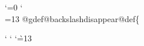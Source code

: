 {{%
%
\def\commondummiesnofonts{%
  \commondummyletter\!%
  \commondummyaccent\"%
  \commondummyaccent\'%
  \commondummyletter\*%
  \commondummyaccent\,%
  \commondummyletter\.%
  \commondummyletter\/%
  \commondummyletter\:%
  \commondummyaccent\=%
  \commondummyletter\?%
  \commondummyaccent\^%
  \commondummyaccent\`%
  \commondummyaccent\~%
  \commondummyword\u
  \commondummyword\v
  \commondummyword\H
  \commondummyword\dotaccent
  \commondummyword\ogonek
  \commondummyword\ringaccent
  \commondummyword\tieaccent
  \commondummyword\ubaraccent
  \commondummyword\udotaccent
  \commondummyword\dotless
  \commondummyword\b
  \commondummyword\i
  \commondummyword\r
  \commondummyword\sansserif
  \commondummyword\sc
  \commondummyword\slanted
  \commondummyword\t
  \commondummyword\abbr
  \commondummyword\acronym
  \commondummyword\anchor
  \commondummyword\cite
  \commondummyword\code
  \commondummyword\command
  \commondummyword\dfn
  \commondummyword\dmn
  \commondummyword\email
  \commondummyword\emph
  \commondummyword\env
  \commondummyword\file
  \commondummyword\image
  \commondummyword\indicateurl
  \commondummyword\inforef
  \commondummyword\kbd
  \commondummyword\key
  \commondummyword\math
  \commondummyword\option
  \commondummyword\pxref
  \commondummyword\ref
  \commondummyword\samp
  \commondummyword\strong
  \commondummyword\tie
  \commondummyword\U
  \commondummyword\uref
  \commondummyword\url
  \commondummyword\var
  \commondummyword\verb
  \commondummyword\w
  \commondummyword\xref
}

\let\indexlbrace\relax
\let\indexrbrace\relax
\let\indexatchar\relax

{\catcode`\@=0
\catcode`\\=13
  @gdef@backslashdisappear{@def\{}}
}

{
\catcode`
\catcode`
\catcode`\`=13
  \gdef\indexnonalnumdisappear{%
    \expandafter\ifx\csname SETtxiindexlquoteignore\endcsname\relax\else
      \let`=\empty
    \fi
    \expandafter\ifx\csname SETtxiindexbackslashignore\endcsname\relax\else
      \backslashdisappear
    \fi
    \expandafter\ifx\csname SETtxiindexhyphenignore\endcsname\relax\else
      \def-{}%
    \fi
    \expandafter\ifx\csname SETtxiindexlessthanignore\endcsname\relax\else
      \def<{}%
    \fi
    \expandafter\ifx\csname SETtxiindexatsignignore\endcsname\relax\else
      \def\@{}%
    \fi
  }

}}
